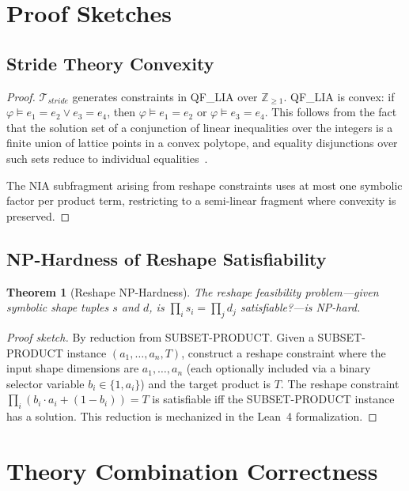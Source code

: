 \documentclass[10pt]{article}
\newcommand{\Tstride}{\mathcal{T}_{\mathit{stride}}}
\theoremstyle{plain}
\newtheorem{theorem}{Theorem}[section]
\theoremstyle{definition}
\theoremstyle{remark}
\begin{document}
\section{Proof Sketches}\label{app:proofs}

\subsection{Stride Theory Convexity}

\begin{proof}
$\Tstride$ generates constraints in QF\_LIA over
$\mathbb{Z}_{\geq 1}$.  QF\_LIA is convex: if
$\varphi \models e_1 = e_2 \lor e_3 = e_4$, then
$\varphi \models e_1 = e_2$ or $\varphi \models e_3 = e_4$.
This follows from the fact that the solution set of a conjunction
of linear inequalities over the integers is a finite union of
lattice points in a convex polytope, and equality disjunctions over
such sets reduce to individual equalities~\cite{lassez88}.

The NIA subfragment arising from reshape constraints uses at most
one symbolic factor per product term, restricting to a semi-linear
fragment where convexity is preserved.
\end{proof}

\subsection{NP-Hardness of Reshape Satisfiability}

\begin{theorem}[Reshape NP-Hardness]
The reshape feasibility problem---given symbolic shape tuples
$s$ and $d$, is $\prod_i s_i = \prod_j d_j$ satisfiable?---is
NP-hard.
\end{theorem}

\begin{proof}[Proof sketch]
By reduction from SUBSET-PRODUCT.  Given a SUBSET-PRODUCT instance
$(a_1, \ldots, a_n, T)$, construct a reshape constraint where the
input shape dimensions are $a_1, \ldots, a_n$ (each optionally
included via a binary selector variable $b_i \in \{1, a_i\}$) and
the target product is $T$.  The reshape constraint
$\prod_i (b_i \cdot a_i + (1-b_i)) = T$ is satisfiable iff the
SUBSET-PRODUCT instance has a solution.  This reduction is
mechanized in the Lean~4 formalization.
\end{proof}


\section{Theory Combination Correctness}\label{app:theory-correctness}
\end{document}
